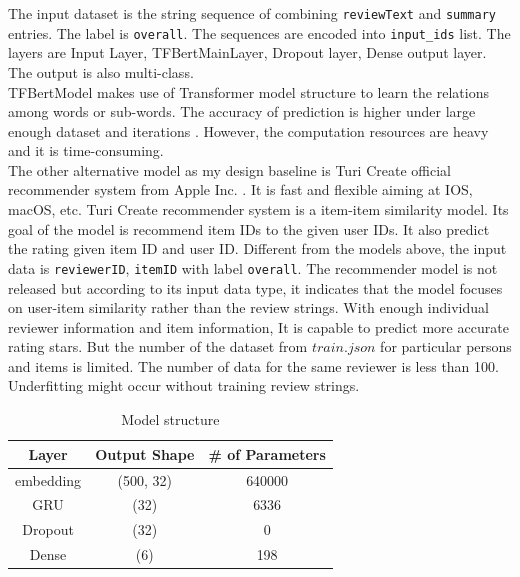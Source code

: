 \documentclass[12pt]{article}
\begin{document}
The input dataset is the string
sequence of combining \texttt{reviewText} and \texttt{summary} entries. The label is \texttt{overall}. The sequences are
encoded into \texttt{input\_ids} list. The layers are Input Layer, TFBertMainLayer, Dropout layer, Dense output
layer. The output is also multi-class.\\
TFBertModel makes use of Transformer model structure to learn the relations among words or sub-words.
The accuracy of prediction is higher under large enough dataset and iterations \cite{BERTpros}. 
However, the computation resources are heavy and it is time-consuming.\\
The other alternative model as my design baseline is Turi Create official recommender system from Apple Inc. \cite{graph}.
It is fast and flexible aiming at IOS, macOS, etc. Turi Create recommender system is a item-item similarity model.
Its goal of the model is recommend item IDs to the given user IDs. It also predict the rating given item ID and user ID.
Different from the models above, 
the input data is \texttt{reviewerID}, \texttt{itemID} with label \texttt{overall}. The recommender model is not
released but according to its input data type, it indicates
that the model focuses on user-item similarity rather than the review strings. 
With enough individual reviewer information and item information, It is capable to predict more accurate rating
stars. But the number of the dataset from $train.json$ for particular persons and items is limited. The number of
data for 
the same reviewer is less than 100. Underfitting might occur
without training review strings.
\begin{table}[h!]
    \centering
        \begin{tabular}{|c|c|c|}
        \hline
        Layer & Output Shape & \# of Parameters \\
        \hline 
        embedding & (500, 32) & 640000 \\
        \hline
        GRU &                   (32) &               6336 \\
        \hline
        Dropout &                   (32) &               0 \\
        \hline
        Dense  &               (6)     &            198  \\
        \hline
        \end{tabular}
    \caption{Model structure}
    \label{table:ms}
\end{table}
\end{document}
